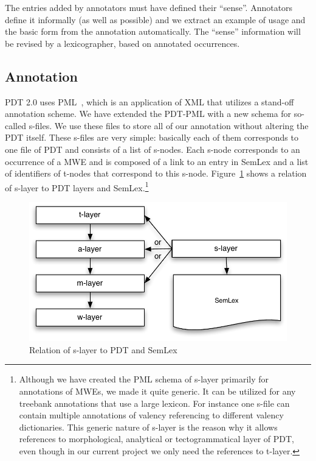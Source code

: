 The entries added by annotators must have defined their ``sense''. Annotators define it informally (as well as possible) and we extract an example of usage and the basic form from the annotation automatically. The ``sense'' information will be revised by a lexicographer, based on annotated occurrences.


\subsection{Annotation}
\label{sec:meth:annot}

PDT 2.0 uses PML~\cite{pajas:2005}, which is an application of XML that utilizes a stand-off annotation scheme. We have extended the PDT-PML with a new schema for so-called s-files. We use these files to store all of our annotation without altering the PDT itself.
These s-files are very simple: basically each of them corresponds to one file of PDT and consists of a list of s-nodes. Each s-node corresponds to an occurrence of a MWE and is composed of a link to an entry in SemLex and a list of identifiers of t-nodes that correspond to this \mbox{s-node}. Figure~\ref{fig:s-layer} shows a relation of s-layer to PDT layers and SemLex.\footnote{Although we have created the PML schema of s-layer primarily for annotations of MWEs, we made it quite generic. It can be utilized for any treebank annotations that use a large lexicon. For instance one s-file can contain multiple annotations of valency referencing to different valency dictionaries. This generic nature of s-layer is the reason why it allows references to morphological, analytical or tectogrammatical layer of PDT, even though in our current project we only need the references to t-layer.}
\begin{figure}[htbp]
   \centering
   \includegraphics[scale=.5]{images/layers-with-s-layer.pdf} %
   \caption{Relation of s-layer to PDT and SemLex}
   \label{fig:s-layer}
\end{figure}


